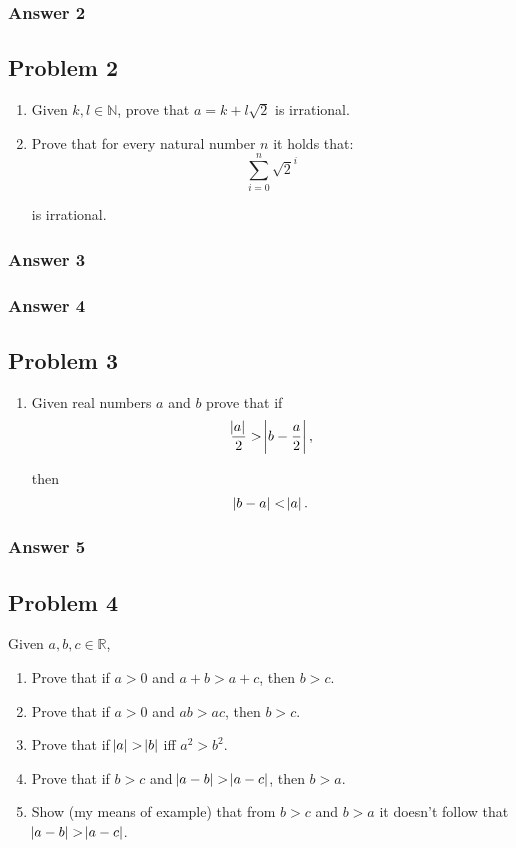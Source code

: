 \documentclass[11pt]{article}
\begin{document}
\subsubsection{Answer 2}
\label{sec-1-1-2}
\subsection{Problem 2}
\label{sec-1-2}
\begin{enumerate}
\item Given $k, l \in \mathbb{N}$, prove that $a=k+l\sqrt{2}$ is irrational.
\item Prove that for every natural number $n$ it holds that:
\begin{equation*}
   \sum_{i=0}^n \sqrt{2}^i
\end{equation*}

is irrational.
\end{enumerate}

\subsubsection{Answer 3}
\label{sec-1-2-1}
\subsubsection{Answer 4}
\label{sec-1-2-2}
\subsection{Problem 3}
\label{sec-1-3}
\begin{enumerate}
\item Given real numbers $a$ and $b$ prove that if
\begin{equation*}
   \frac{\abs{a}}{2}>\abs{b-\frac{a}{2}},
\end{equation*}

then
\begin{equation*}
   \abs{b-a}<\abs{a}.
\end{equation*}
\end{enumerate}

\subsubsection{Answer 5}
\label{sec-1-3-1}

\subsection{Problem 4}
\label{sec-1-4}
Given $a, b, c \in \mathbb{R}$,
\begin{enumerate}
\item Prove that if $a > 0$ and $a + b > a + c$, then $b > c$.
\item Prove that if $a > 0$ and $ab > ac$, then $b > c$.
\item Prove that if $\abs{a} > \abs{b}$ iff $a^2 > b^2$.
\item Prove that if $b > c$ and $\abs{a-b} > \abs{a-c}$, then $b > a$.
\item Show (my means of example) that from $b > c$ and $b > a$ it doesn't
follow that $\abs{a-b} > \abs{a-c}$.
\end{enumerate}
\end{document}
